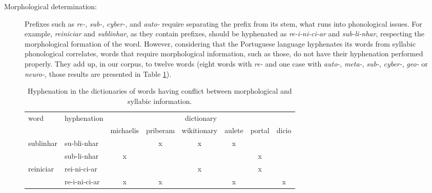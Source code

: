 \documentclass{article}
\begin{document}
\begin{description} 
    \item[Morphological determination:] Prefixes such as \emph{re-},
	\emph{sub-}, \emph{cyber-}, and \emph{auto-} require separating the
	prefix from its stem, what runs into phonological issues. For example,
	\emph{reiniciar} and \emph{sublinhar}, as they contain prefixes, should
	be hyphenated as \emph{re-i-ni-ci-ar} and \emph{sub-li-nhar},
	respecting the morphological formation of the word. However,
	considering that the Portuguese language hyphenates its words from
	syllabic phonological correlates, words that require morphological
	information, such as those, do not have their hyphenation performed
	properly. They add up, in our corpus, to twelve words (eight words with
	\emph{re-} and one case with \emph{auto-}, \emph{meta-}, \emph{sub-},
	\emph{cyber-}, \emph{geo-} or \emph{neuro-}, those results are presented
	in Table \ref{tab-mor-syl}).


	\begin{table}
	\scriptsize
	\caption{Hyphenation in the dictionaries of words having conflict between morphological and syllabic information.}
	\label{tab-mor-syl}
        \begin{tabular}{ll*{6}{c}}
	\toprule
	    word                   & hyphenation  & \multicolumn{6}{c}{dictionary} \\
             &                                    & michaelis & priberam & wikitionary & aulete & portal & dicio \\
	\midrule
        \multirow{2}{*}{sublinhar} & su-bli-nhar  &           & x        & x           & x      &        &       \\
				   & sub-li-nhar  & x         &          &             &        & x      &       \\
	\multirow{2}{*}{reiniciar} & rei-ni-ci-ar &           &          & x           &        & x      &       \\
				   & re-i-ni-ci-ar & x        & x        &             & x      &        & x     \\
	\bottomrule
	\end{tabular}
	\end{table}


\end{description}
\end{document}

